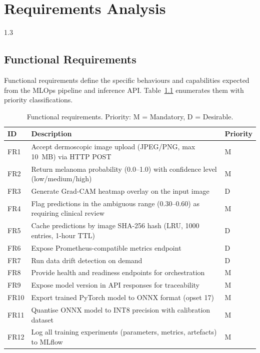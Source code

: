 
\chapter{Requirements Analysis}
\begin{spacing}{1.3}

\section{Functional Requirements}

Functional requirements define the specific behaviours and capabilities expected from the MLOps pipeline and inference API. Table~\ref{tab:fr} enumerates them with priority classifications.

\begin{table}[H]
\centering
\caption{Functional requirements. Priority: M = Mandatory, D = Desirable.}
\label{tab:fr}
\begin{tabular}{p{0.7cm}p{9.5cm}p{2cm}}
\toprule
\textbf{ID} & \textbf{Description} & \textbf{Priority} \\
\midrule
FR1  & Accept dermoscopic image upload (JPEG/PNG, max 10~MB) via HTTP POST & M \\
FR2  & Return melanoma probability (0.0--1.0) with confidence level (low/medium/high) & M \\
FR3  & Generate Grad-CAM heatmap overlay on the input image & D \\
FR4  & Flag predictions in the ambiguous range (0.30--0.60) as requiring clinical review & M \\
FR5  & Cache predictions by image SHA-256 hash (LRU, 1000 entries, 1-hour TTL) & D \\
FR6  & Expose Prometheus-compatible metrics endpoint & D \\
FR7  & Run data drift detection on demand & D \\
FR8  & Provide health and readiness endpoints for orchestration & M \\
FR9  & Expose model version in API responses for traceability & M \\
FR10 & Export trained PyTorch model to ONNX format (opset 17) & M \\
FR11 & Quantise ONNX model to INT8 precision with calibration dataset & M \\
FR12 & Log all training experiments (parameters, metrics, artefacts) to MLflow & M \\
\bottomrule
\end{tabular}
\end{table}


\end{spacing}
